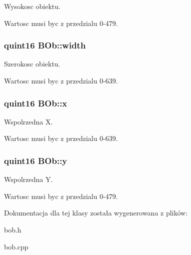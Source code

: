 Wysokosc obiektu. 

Wartosc musi byc z przedzialu 0-479. \hypertarget{class_b_ob_3e1652784396111952cd16a77a666a2b}{
\subsubsection[{width}]{\setlength{\rightskip}{0pt plus 5cm}quint16 {\bf BOb::width}}}
\label{class_b_ob_3e1652784396111952cd16a77a666a2b}


Szerokosc obiektu. 

Wartosc musi byc z przedzialu 0-639. \hypertarget{class_b_ob_5dcc6a3c2f4ffaf3d630187e853dd876}{
\subsubsection[{x}]{\setlength{\rightskip}{0pt plus 5cm}quint16 {\bf BOb::x}}}
\label{class_b_ob_5dcc6a3c2f4ffaf3d630187e853dd876}


Wspolrzedna X. 

Wartosc musi byc z przedzialu 0-639. \hypertarget{class_b_ob_da96bf49e446d3f9a5ce02f36e44c9b4}{
\subsubsection[{y}]{\setlength{\rightskip}{0pt plus 5cm}quint16 {\bf BOb::y}}}
\label{class_b_ob_da96bf49e446d3f9a5ce02f36e44c9b4}


Wspolrzedna Y. 

Wartosc musi byc z przedzialu 0-479. 

Dokumentacja dla tej klasy została wygenerowana z plików:\begin{CompactItemize}
\item 
bob.h\item 
bob.cpp\end{CompactItemize}
